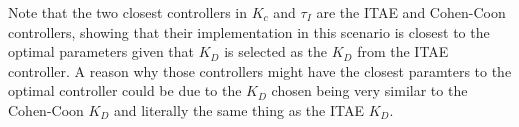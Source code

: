 \documentclass[12pt]{article}
\begin{document}
\begin{enumerate}
\begin{enumerate}
    Note that the two closest controllers in $K_c$ and $\tau_I$ are the ITAE and Cohen-Coon controllers, showing that their implementation in this scenario is closest to the optimal parameters given that $K_D$ is selected as the $K_D$ from the ITAE controller. A reason why those controllers might have the closest paramters to the optimal controller could be due to the $K_D$ chosen being very similar to the Cohen-Coon $K_D$ and literally the same thing as the ITAE $K_D$.



    

  \end{enumerate}

\end{enumerate}
\end{document}
